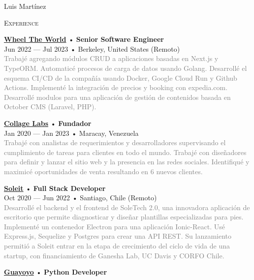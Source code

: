\documentclass[12pt]{article}
\begin{document}
\begin{cv}{Luis Mart\'inez}
\begin{minipage}[t]{0.55\textwidth}
    \textrm{\textsc{\Large{Experience}}}
    \newline
    \parbox[t]{\linewidth}{
      \textbf{\href{https://wheeltheworld.com}{Wheel The World}} • \textrm{\textbf{Senior Software Engineer}}\\
      Jun 2022 --- Jul 2023 • Berkeley, United States (Remoto)\\
      \footnotesize{\textcolor{gray}{Trabajé agregando módulos CRUD a aplicaciones basadas en Next.js y TypeORM. Automaticé procesos de carga de datos usando Golang. Desarrollé el esquema CI/CD de la compañía usando Docker, Google Cloud Run y Github Actions. Implementé la integración de precios y booking con expedia.com. Desarrollé modulos para una aplicación de gestión de contenidos basada en October CMS (Laravel, PHP).}}\\
    }\vspace{0.125em}
    \parbox[t]{\linewidth}{
      \textbf{\href{https://collagelabs.org}{Collage Labs}} • \textrm{\textbf{Fundador}}\\
      Jan 2020 --- Jan 2023 • Maracay, Venezuela\\
      \footnotesize{\textcolor{gray}{Trabajé con analistas de requerimientos y desarrolladores supervisando el cumplimiento de tareas para clientes en todo el mundo. Trabajé con diseñadores para definir y lanzar el sitio web y la presencia en las redes sociales. Identifiqué y maximicé oportunidades de venta resultando en 6 nuevos clientes.}}\\
    }\vspace{0.125em}
    \parbox[t]{\linewidth}{
      \textbf{\href{https://soleit.app}{Soleit}} • \textrm{\textbf{Full Stack Developer}}\\
      Oct 2020 --- Jun 2022 • Santiago, Chile (Remoto)\\
      \footnotesize{\textcolor{gray}{Desarrollé el backend y el frontend de SoleTech 2.0, una innovadora aplicación de escritorio que permite diagnosticar y diseñar plantillas especializadas para pies. Implementé un contenedor Electron para una aplicación Ionic-React. Usé Express.js, Sequelize y Postgres para crear una API REST. Su lanzamiento permitió a Soleit entrar en la etapa de crecimiento del ciclo de vida de una startup, con financiamiento de Ganesha Lab, UC Davis y CORFO Chile.}}\\
    }\vspace{0.125em}
    \parbox[t]{\linewidth}{
      \textbf{\href{https://guayoyo.io}{Guayoyo}} • \textrm{\textbf{Python Developer}}\\
}
\end{minipage}
\end{cv}
\end{document}

